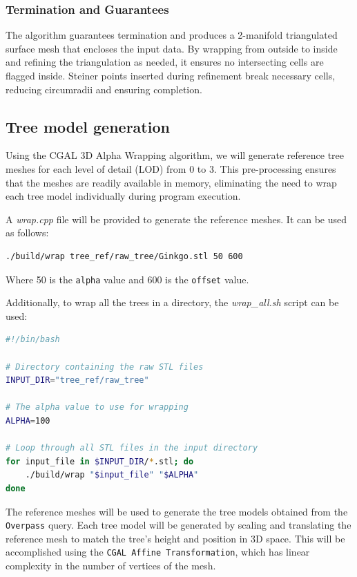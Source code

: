 \documentclass[12pt]{article}
\begin{document}
\subsubsection{Termination and Guarantees}
The algorithm guarantees termination and produces a 2-manifold triangulated
surface mesh that encloses the input data. By wrapping from outside to inside
and refining the triangulation as needed, it ensures no intersecting cells are
flagged inside. Steiner points inserted during refinement break necessary cells,
 reducing circumradii and ensuring completion.


\subsection{Tree model generation}
Using the CGAL 3D Alpha Wrapping algorithm, we will generate reference tree
meshes for each level of detail (LOD) from 0 to 3. This pre-processing ensures
that the meshes are readily available in memory, eliminating the need to wrap
each tree model individually during program execution.

A \textit{wrap.cpp} file will be provided to generate the reference meshes.
It can be used as follows:

\begin{lstlisting}[language=bash]
./build/wrap tree_ref/raw_tree/Ginkgo.stl 50 600
\end{lstlisting}

Where 50 is the \texttt{alpha} value and 600 is the \texttt{offset} value.

Additionally, to wrap all the trees in a directory, the \textit{wrap\_all.sh}
script can be used:

\begin{lstlisting}[language=bash]
#!/bin/bash

# Directory containing the raw STL files
INPUT_DIR="tree_ref/raw_tree"

# The alpha value to use for wrapping
ALPHA=100

# Loop through all STL files in the input directory
for input_file in $INPUT_DIR/*.stl; do
	./build/wrap "$input_file" "$ALPHA"
done
\end{lstlisting}

The reference meshes will be used to generate the tree models obtained from
the \texttt{Overpass} query. Each tree model will be generated by scaling and
translating the reference mesh to match the tree's height and position in 3D space.
 This will be accomplished using the \texttt{CGAL Affine Transformation}\cite{cgal_affine_transformation},
which has linear complexity in the number of vertices of the mesh.
\end{document}
